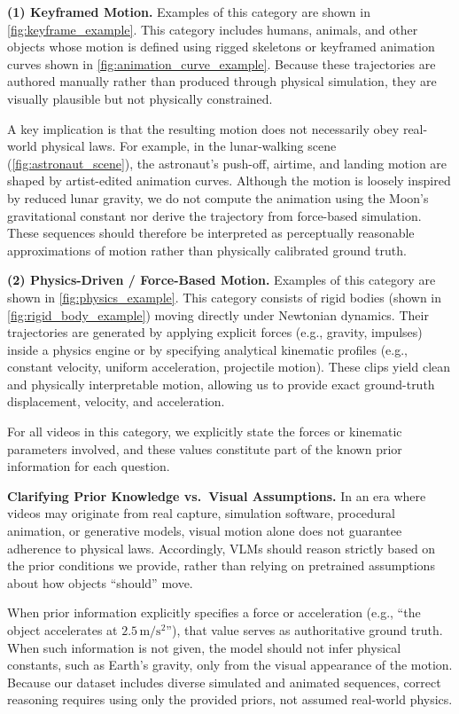\noindent\textbf{(1) Keyframed Motion.} 
Examples of this category are shown in \autoref{fig:keyframe_example}.
This category includes humans, animals, and other objects whose motion is defined using rigged skeletons or keyframed animation curves shown in \autoref{fig:animation_curve_example}. Because these trajectories are authored manually rather than produced through physical simulation, they are {visually plausible but not physically constrained}.

A key implication is that the resulting motion does not necessarily obey real-world physical laws. For example, in the lunar-walking scene (\autoref{fig:astronaut_scene}), the astronaut’s push-off, airtime, and landing motion are shaped by artist-edited animation curves. Although the motion is loosely inspired by reduced lunar gravity, we do not compute the animation using the Moon's gravitational constant nor derive the trajectory from force-based simulation. These sequences should therefore be interpreted as {perceptually reasonable approximations} of motion rather than physically calibrated ground truth.

\noindent\textbf{(2) Physics-Driven / Force-Based Motion.}
Examples of this category are shown in \autoref{fig:physics_example}.
This category consists of rigid bodies (shown in \autoref{fig:rigid_body_example}) moving directly under Newtonian dynamics. Their trajectories are generated by applying explicit forces (e.g., gravity, impulses) inside a physics engine or by specifying analytical kinematic profiles (e.g., constant velocity, uniform acceleration, projectile motion). These clips yield clean and physically interpretable motion, allowing us to provide exact ground-truth displacement, velocity, and acceleration.

For all videos in this category, we explicitly state the forces or kinematic parameters involved, and these values constitute part of the known prior information for each question.

\noindent\textbf{Clarifying Prior Knowledge vs.\ Visual Assumptions.}
In an era where videos may originate from real capture, simulation software, procedural animation, or generative models, visual motion alone does not guarantee adherence to physical laws. Accordingly, VLMs should reason strictly based on the prior conditions we provide, rather than relying on pretrained assumptions about how objects “should” move.

When prior information explicitly specifies a force or acceleration (e.g., “the object accelerates at $2.5\,\mathrm{m/s^2}$”), that value serves as authoritative ground truth. When such information is not given, the model should not infer physical constants, such as Earth's gravity, only from the visual appearance of the motion. Because our dataset includes diverse simulated and animated sequences, correct reasoning requires using only the provided priors, not assumed real-world physics.

